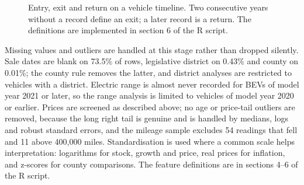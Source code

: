\documentclass{xmum_asg}
\begin{document}
\begin{figure}[htbp]
\centering
{}
\caption{Entry, exit and return on a vehicle timeline. Two consecutive years without a record define an exit; a later record is a return. The definitions are implemented in section 6 of the R script.}
\label{fig:timeline}
\end{figure}

Missing values and outliers are handled at this stage rather than dropped silently. Sale dates are blank on 73.5\% of rows, legislative district on 0.43\% and county on 0.01\%; the county rule removes the latter, and district analyses are restricted to vehicles with a district. Electric range is almost never recorded for BEVs of model year 2021 or later, so the range analysis is limited to vehicles of model year 2020 or earlier. Prices are screened as described above; no age or price-tail outliers are removed, because the long right tail is genuine and is handled by medians, logs and robust standard errors, and the mileage sample excludes 54 readings that fell and 11 above 400,000 miles. Standardisation is used where a common scale helps interpretation: logarithms for stock, growth and price, real prices for inflation, and z-scores for county comparisons. The feature definitions are in sections 4--6 of the R script.
\end{document}
